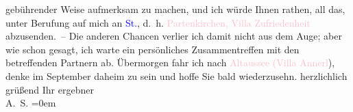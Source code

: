                     gebührender Weise aufmerksam zu machen, {\pb}und ich würde
                    Ihnen rathen, all das, unter Berufung auf mich an \textcolor{blue}{St.}{}\ledrightnote{\textcolor{blue}{Albert Steinrück}}, d. h. \textcolor{pink}{Partenkirchen, Villa
                        Zufriedenheit}{}\ledrightnote{\textcolor{pink}{Villa Zufriedenheit}} abzusenden. – Die anderen Chancen verlier ich damit nicht
                    aus dem Auge; aber wie schon gesagt, ich warte ein persönliches Zusammentreffen
                    mit den betreffenden Partnern ab.\pend
           \pstart
           Übermorgen fahr ich nach \textcolor{pink}{Altaussee (Villa
                        Annerl}{}\ledrightnote{\textcolor{pink}{Villa Annerl}}), denke im September daheim zu sein und hoffe Sie
                    bald wiederzusehn.\pend
           \pstart
           herzlichlich grüßend Ihr ergebner{\\[\baselineskip]}\spacefill\mbox{A. S.}\pend
           \leftskip=0em{}\endnumbering{}  
      